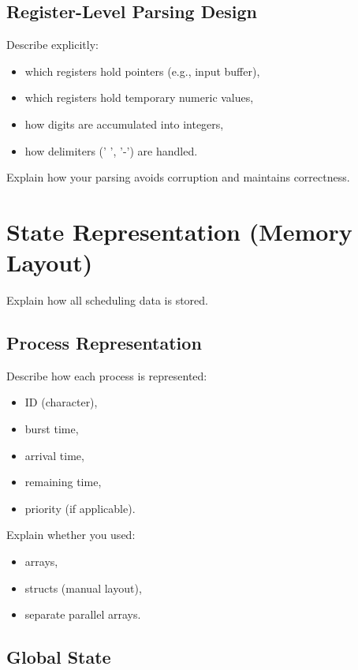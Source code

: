 \documentclass[a4paper,12pt]{article}
\begin{document}
\subsection{Register-Level Parsing Design}

Describe explicitly:

\begin{itemize}
\item which registers hold pointers (e.g., input buffer),
\item which registers hold temporary numeric values,
\item how digits are accumulated into integers,
\item how delimiters (' ', '-') are handled.
\end{itemize}

Explain how your parsing avoids corruption and maintains correctness.

\section{State Representation (Memory Layout)}

Explain how all scheduling data is stored.

\subsection{Process Representation}

Describe how each process is represented:

\begin{itemize}
\item ID (character),
\item burst time,
\item arrival time,
\item remaining time,
\item priority (if applicable).
\end{itemize}

Explain whether you used:
\begin{itemize}
\item arrays,
\item structs (manual layout),
\item separate parallel arrays.
\end{itemize}

\subsection{Global State}
\end{document}
